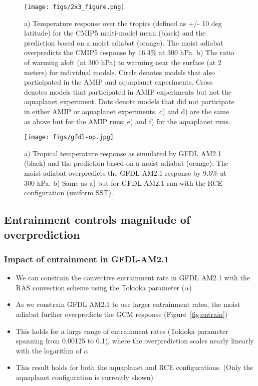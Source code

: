 \documentclass[draft]{agujournal2019}
\begin{document}
\begin{figure}
\centering
\texttt{[image: figs/2x3\_figure.png]}
\caption{a) Temperature response over the tropics (defined as +/- 10 deg latitude) for the CMIP5 multi-model mean (black) and the prediction based on a moist adiabat (orange). The moist adiabat overpredicts the CMIP5 response by 16.4\% at 300 hPa. b) The ratio of warming aloft (at 300 hPa) to warming near the surface (at 2 meters) for individual models. Circle denotes models that also participated in the AMIP and aquaplanet experiments. Cross denotes models that participated in AMIP experiments but not the aquaplanet experiment. Dots denote models that did not participate in either AMIP or aquaplanet experiments. c) and d) are the same as above but for the AMIP runs; e) and f) for the aquaplanet runs.}
\label{fig:aogcm-op}
\end{figure}

\begin{figure}
\centering
\texttt{[image: figs/gfdl-op.jpg]}
\caption{a) Tropical temperature response as simulated by GFDL AM2.1 (black) and the prediction based on a moist adiabat (orange). The moist adiabat overpredicts the GFDL AM2.1 response by 9.6\% at 300 hPa. b) Same as a) but for GFDL AM2.1 run with the RCE configuration (uniform SST).}
\label{fig:gfdl-op}
\end{figure}

\subsection{Entrainment controls magnitude of overprediction}
\subsubsection{Impact of entrainment in GFDL-AM2.1}
\begin{itemize}
\item We can constrain the convective entrainment rate in GFDL AM2.1 with the RAS convection scheme using the Tokioka parameter ($\alpha$)
\item As we constrain GFDL AM2.1 to use larger entrainment rates, the moist adiabat further overpredicts the GCM response (Figure~\ref{fig:entrain})
\item This holds for a large range of entrainment rates (Tokioka parameter spanning from 0.00125 to 0.1), where the overprediction scales nearly linearly with the logarithm of $\alpha$
\item This result holds for both the aquaplanet and RCE configurations. (Only the aquaplanet configuration is currently shown)
\end{itemize}
\end{document}
